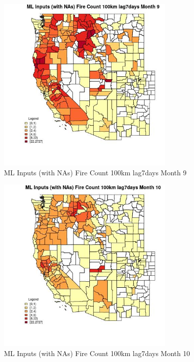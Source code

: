 \begin{figure} 
\centering  
\includegraphics[width=0.77\textwidth]{Code_Outputs/Report_ML_input_PM25_Step4_part_f_de_duplicated_aves_prioritize_24hr_obswNAs_CountyFire_Count_100km_lag7daysmedianMonth9.jpg} 
\caption{\label{fig:Report_ML_input_PM25_Step4_part_f_de_duplicated_aves_prioritize_24hr_obswNAsCountyFire_Count_100km_lag7daysmedianMonth9}ML Inputs (with NAs) Fire Count 100km lag7days Month 9} 
\end{figure} 
 

\begin{figure} 
\centering  
\includegraphics[width=0.77\textwidth]{Code_Outputs/Report_ML_input_PM25_Step4_part_f_de_duplicated_aves_prioritize_24hr_obswNAs_CountyFire_Count_100km_lag7daysmedianMonth10.jpg} 
\caption{\label{fig:Report_ML_input_PM25_Step4_part_f_de_duplicated_aves_prioritize_24hr_obswNAsCountyFire_Count_100km_lag7daysmedianMonth10}ML Inputs (with NAs) Fire Count 100km lag7days Month 10} 
\end{figure} 
 

